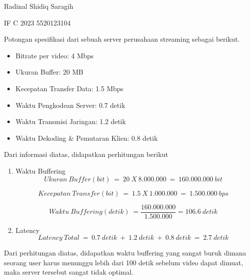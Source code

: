 \documentclass[12pt,a4paper]{article}
\date{}
\begin{document}
    Radinal Shidiq Saragih

    IF C 2023 5520123104

    \vspace{1cm}
    
    Potongan spesifikasi dari sebuah server perusahaan streaming sebagai berikut.

    \begin{itemize}
      \item Bitrate per video: 4 Mbps
      \item Ukuran Buffer: 20 MB
      \item Kecepatan Transfer Data: 1.5 Mbps
      \item Waktu Pengkodean Server: 0.7 detik
      \item Waktu Transmisi Jaringan: 1.2 detik
      \item Waktu Dekoding & Pemutaran Klien: 0.8 detik
    \end{itemize}

    Dari informasi diatas, didapatkan perhitungan berikut
    \begin{enumerate}
      \item Waktu Buffering
        \[
          Ukuran\ Buffer(bit)\ =\ 20\ X\ 8.000.000\ =\ 160.000.000\ bit
        \]

        \[
          Kecepatan\ Transfer(bit)\ =\ 1.5\ X\ 1.000.000\ =\ 1.500.000\ bps
        \]

        \[
          Waktu\ Buffering(detik)\ = \frac{160.000.000}{1.500.000} = 106.6\ detik
        \]

      \item Latency
        \[
          Latency\ Total\ =\ 0.7\ detik\ +\ 1.2\ detik\ +\ 0.8\ detik\ =\ 2.7\ detik
        \]
    \end{enumerate}

    Dari perhitungan diatas, didapatkan waktu buffering yang sangat buruk dimana
    seorang user harus menunggu lebih dari 100 detik sebelum video dapat dimuat,
    maka server tersebut sangat tidak optimal.
\end{document}
